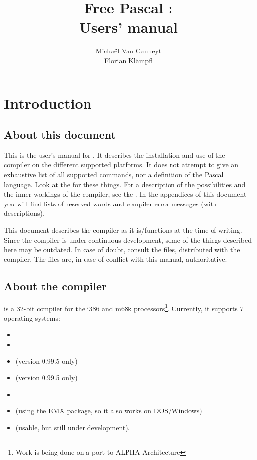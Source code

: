 \documentclass{report}
\begin{document}
\title{Free Pascal :\\ Users' manual}

\author{Micha\"el Van Canneyt\\Florian Kl\"ampfl}
\maketitle
\tableofcontents

\chapter{Introduction}

\section{About this document}
This is the user's manual for \fpc . It describes the installation and
use of the \fpc compiler on the different supported platforms.
It does not attempt to give an exhaustive list of all supported commands,
nor a definition of the Pascal language. Look at the
 for these things.
For a description of the
possibilities and the inner workings of the compiler, see the
\progref . In the appendices of this document you will find lists of
reserved words and compiler error messages (with descriptions).

This document describes the compiler as it is/functions at the time of
writing. Since the compiler is under continuous development, some of the
things described here may be outdated. In case of doubt, consult the
 files, distributed with the compiler.
The  files are, in case of conflict with this manual,
authoritative.

\section{About the compiler}
\fpc is a 32-bit compiler for the i386 and m68k processors\footnote{Work is being done
on a port to ALPHA Architecture}. Currently, it supports 7 operating systems:
\begin{itemize}
\item \dos
\item \linux
\item \atari (version 0.99.5 only)
\item \amiga (version 0.99.5 only)
\item \windows
\item \ostwo (using the EMX package, so it also works on DOS/Windows)
\item \freebsd (usable, but still under development).
\end{itemize}
\end{document}
